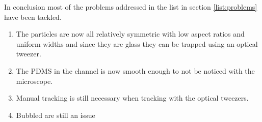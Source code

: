 In conclusion most of the problems addressed in the list in section \ref{list:problems} have been tackled. 

\begin{enumerate} \label{list:solutions}
	\item The particles are now all relatively symmetric with low aspect ratios and uniform widths and since they are glass they can be trapped using an optical tweezer.
	\item The PDMS in the channel is now smooth enough to not be noticed with the microscope.
	\item Manual tracking is still necessary when tracking with the optical tweezers.
	\item Bubbled are still an issue
\end{enumerate}
